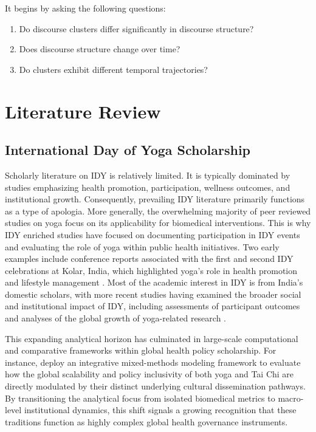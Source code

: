 \documentclass[11pt]{article}
\begin{document}
It begins by asking the following questions:

\begin{enumerate}

\item Do discourse clusters differ significantly in discourse structure?

\item Does discourse structure change over time?

\item Do clusters exhibit different temporal trajectories?

\end{enumerate}

\section{Literature Review}


\subsection{International Day of Yoga Scholarship}

Scholarly literature on IDY is relatively limited. It is typically dominated by studies emphasizing health promotion, participation, wellness outcomes, and institutional growth. Consequently, prevailing IDY literature primarily functions as a type of apologia. More generally, the overwhelming majority of peer reviewed studies on yoga focus on its applicability for biomedical interventions. This is why IDY enriched studies have focused on documenting participation in IDY events and evaluating the role of yoga within public health initiatives. Two early examples include conference reports associated with the first and second IDY celebrations at Kolar, India, which highlighted yoga's role in health promotion and lifestyle management \cite{bhattacharyya2015,patil2016}. Most of the academic interest in IDY is from India's domestic scholars, with more recent studies having examined the broader social and institutional impact of IDY, including assessments of participant outcomes and analyses of the global growth of yoga-related research \cite{manjunath2023,mohan2024,prasad2025}.

This expanding analytical horizon has culminated in large-scale computational and comparative frameworks within global health policy scholarship. For instance, \citet{zhou2026yoga} deploy an integrative mixed-methods modeling framework to evaluate how the global scalability and policy inclusivity of both yoga and Tai Chi are directly modulated by their distinct underlying cultural dissemination pathways. By transitioning the analytical focus from isolated biomedical metrics to macro-level institutional dynamics, this shift signals a growing recognition that these traditions function as highly complex global health governance instruments.
\end{document}
